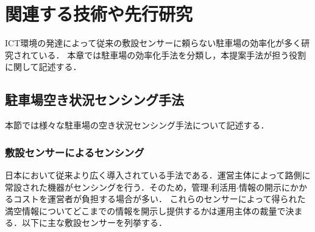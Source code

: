 
\chapter{関連する技術や先行研究}
\label{related}


ICT環境の発達によって従来の敷設センサーに頼らない駐車場の効率化が多く研究されている．
本章では駐車場の効率化手法を分類し，本提案手法が担う役割に関して記述する．

\section{駐車場空き状況センシング手法}
\label{legacy-sensing}
本節では様々な駐車場の空き状況センシング手法について記述する．
\subsection{敷設センサーによるセンシング}
日本において従来より広く導入されている手法である．運営主体によって路側に常設された機器がセンシングを行う．そのため，管理$\cdot$利活用$\cdot$情報の開示にかかるコストを運営者が負担する場合が多い．
これらのセンサーによって得られた満空情報についてどこまでの情報を開示し提供するかは運用主体の裁量で決まる．以下に主な敷設センサーを列挙する．


